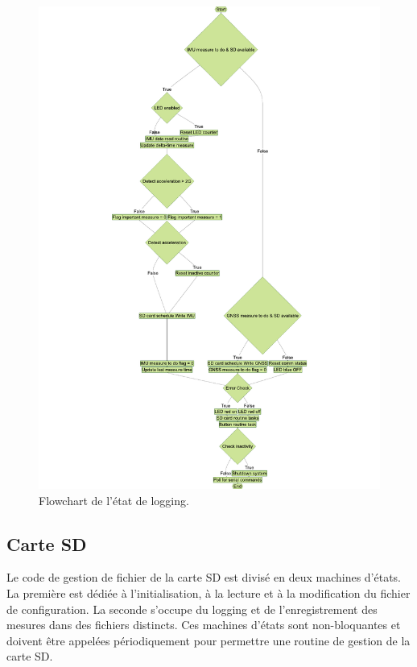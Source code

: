 \begin{figure}[!h]
	\centering
	\includegraphics[width=.95\textwidth]{../figures/code/diagrammes/logging-flowchart}
	\caption{Flowchart de l'état de logging.}
	\label{fig:pdfresizer}
\end{figure}

\clearpage

\subsection{Carte SD}
Le code de gestion de fichier de la carte SD est divisé en deux machines d'états. La première est dédiée à l'initialisation, à la lecture et à la modification du fichier de configuration. La seconde s'occupe du logging et de l'enregistrement des mesures dans des fichiers distincts. Ces machines d'états sont non-bloquantes et doivent être appelées périodiquement pour permettre une routine de gestion de la carte SD.

